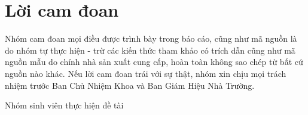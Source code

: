 \chapter*{Lời cam đoan}
\vspace{1.0cm}
Nhóm cam đoan mọi điều được trình bày trong báo cáo, cũng như mã nguồn là do nhóm tự thực hiện - trừ các kiến thức tham khảo có trích dẫn cũng như mã nguồn mẫu do chính nhà sản xuất cung cấp, hoàn toàn không sao chép từ bất cứ nguồn nào khác. Nếu lời cam đoan trái với sự thật, nhóm xin chịu mọi trách nhiệm trước Ban Chủ Nhiệm Khoa và Ban
Giám Hiệu Nhà Trường.
\begin{flushright}
Nhóm sinh viên thực hiện đề tài 
\end{flushright}


\bigskip
 
